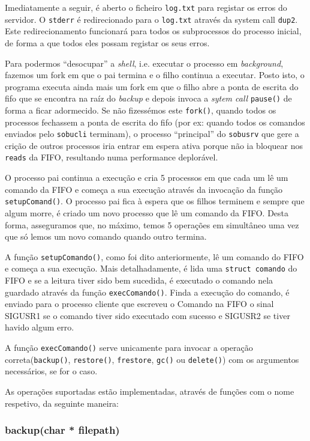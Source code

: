 \documentclass[a4paper,12pt,titlepage,portuguese]{article}
\begin{document}
Imediatamente a seguir, é aberto o ficheiro \texttt{log.txt} para registar os erros do servidor. O \texttt{stderr} é redirecionado para o \texttt{log.txt} através da system call \texttt{dup2}.
Este redirecionamento funcionará para todos os subprocessos do processo inicial, de forma a que todos eles possam registar os seus erros. 

Para podermos ``desocupar'' a \emph{shell}, i.e. executar o processo em \emph{background}, fazemos um fork em que o pai termina e o filho continua a executar. Posto isto, o programa executa ainda mais um fork em que o filho abre a ponta de escrita do fifo que se encontra na raíz do \emph{backup} e depois invoca a \emph{sytem call} \texttt{pause()} de forma a ficar adormecido. Se não fizessémos este \texttt{fork()}, quando todos os processos fechassem a ponta de escrita do fifo (por ex: quando todos os comandos enviados pelo \texttt{sobucli} terminam), o processo ``principal'' do \texttt{sobusrv} que gere a crição de outros processos iria entrar em espera ativa porque não ia bloquear nos \texttt{reads} da FIFO, resultando numa performance deplorável. 

O processo pai continua a execução e cria 5 processos em que cada um lê um comando da FIFO e começa a sua execução através da invocação da função \texttt{setupComand()}. O processo pai fica à espera que os filhos terminem e sempre que algum morre, é criado um novo processo que lê um comando da FIFO. Desta forma, asseguramos que, no máximo, temos 5 operações em simultâneo uma vez que só lemos um novo comando quando outro termina. 

A função \texttt{setupComando()}, como foi dito anteriormente, lê um comando do FIFO e começa a sua execução. Mais detalhadamente, é lida uma \texttt{struct comando} do FIFO e se a leitura tiver sido bem sucedida, é executado o comando nela guardado através da função \texttt{execComando()}. Finda a execução do comando, é enviado para o processo cliente que escreveu o Comando na FIFO o sinal SIGUSR1 se o comando tiver sido executado com sucesso e SIGUSR2 se tiver havido algum erro.

A função \texttt{execComando()} serve unicamente para invocar a operação correta(\texttt{backup()}, \texttt{restore()}, \texttt{frestore}, \texttt{gc()} ou \texttt{delete()}) com os argumentos necessários, se for o caso.

As operações suportadas estão implementadas, através de funções com o nome respetivo, da seguinte maneira:

\subsubsection{backup(char * filepath)}
\end{document}

